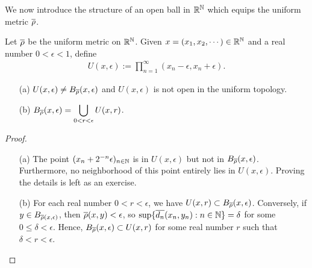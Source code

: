 We now introduce the structure of an open ball in ${\mathbb{R}}^{\mathbb{N}}$ which equips the uniform metric $\overline{\rho}$.
\begin{prop}
    Let $\overline{\rho}$ be the uniform metric on ${\mathbb{R}}^{\mathbb{N}}$.
    Given $x=(x_1, x_2, \cdots)\in{\mathbb{R}}^{\mathbb{N}}$ and a real number $0<\epsilon<1$, define
    \begin{align*}
        U(x, \epsilon):=\prod_{n=1}^\infty (x_n-\epsilon, x_n+\epsilon).
    \end{align*}
    \begin{enumerate}
        \item[(a)] $U(x, \epsilon)\neq B_{\overline{\rho}}(x, \epsilon)$ and $U(x, \epsilon)$ is not open in the uniform topology.
        \item[(b)] $\displaystyle{B_{\overline{\rho}}(x, \epsilon)=\bigcup_{0<r<\epsilon} U(x, r)}$.
    \end{enumerate}
\end{prop}
\begin{proof}
    \begin{enumerate}
        \item[(a)]
            The point $(x_n+2^{-n}\epsilon)_{n\in{\mathbb{N}}}$ is in $U(x, \epsilon)$ but not in $B_{\overline{\rho}}(x, \epsilon)$.
            Furthermore, no neighborhood of this point entirely lies in $U(x, \epsilon)$.
            Proving the details is left as an exercise.
        \item[(b)]
            For each real number $0<r<\epsilon$, we have $U(x, r)\subset B_{\overline{\rho}}(x, \epsilon)$.
            Conversely, if $y\in B_{\overline{\rho}(x, \epsilon)}$, then $\overline{\rho}(x, y)<\epsilon$, so $\sup\{\overline{d_n}(x_n, y_n): n\in{\mathbb{N}}\}=\delta$ for some $0\leq\delta<\epsilon$.
            Hence, $B_{\overline{\rho}}(x, \epsilon)\subset U(x, r)$ for some real number $r$ such that $\delta<r<\epsilon$.
    \end{enumerate}
\end{proof}